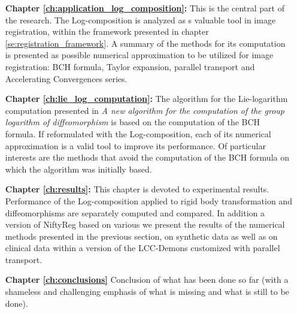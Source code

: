 \begin{enumerate}
	
    \item[{\bf Chapter \ref{ch:application_log_composition}:}] This is the central part of the research. The Log-composition is analyzed as s valuable tool in image registration, within the framework presented in chapter \ref{se:registration_framework}. A summary of the methods for its computation is presented as possible numerical approximation to be utilized for image registration: BCH formula, Taylor expansion, parallel transport and Accelerating Convergences series. 
    
     \item[{\bf Chapter \ref{ch:lie_log_computation}:}] The algorithm for the Lie-logarithm computation presented in \emph{A new algorithm for the computation of the group logarithm of diffeomorphism} \cite{Bossa:08} is based on the computation of the BCH formula. If reformulated with the Log-composition, each of its numerical approximation is a valid tool to improve its performance. Of particular interests are the methods that avoid the computation of the BCH formula on which the algorithm was initially based.
     
	\item[{\bf Chapter \ref{ch:results}:}] This chapter is devoted to experimental results. Performance of the Log-composition applied to rigid body transformation and diffeomorphisms are separately computed and compared. In addition a version of NiftyReg based on various we present the results of the numerical methods presented in the previous section, on synthetic data as well as on clinical data within a version of the  LCC-Demons customized with parallel transport.
	
	\item[{\bf Chapter \ref{ch:conclusions}}] Conclusion of what has been done so far (with a shameless and challenging emphasis of what is missing and what is still to be done).

	
	
\end{enumerate}








